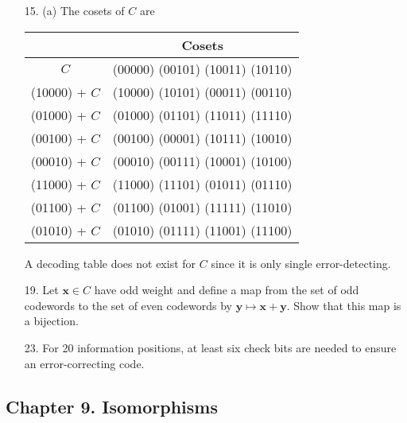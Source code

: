 {\begin{itemize}
 
\item[15.]
(a) The cosets of $C$ are 
\begin{center}
\begin{tabular}{|c|c|}
\hline
 & Cosets \\
\hline
          $C$ & (00000)  (00101)  (10011)  (10110) \\
(10000) + $C$ & (10000)  (10101)  (00011)  (00110) \\
(01000) + $C$ & (01000)  (01101)  (11011)  (11110) \\
(00100) + $C$ & (00100)  (00001)  (10111)  (10010) \\
(00010) + $C$ & (00010)  (00111)  (10001)  (10100) \\
(11000) + $C$ & (11000)  (11101)  (01011)  (01110) \\
(01100) + $C$ & (01100)  (01001)  (11111)  (11010) \\
(01010) + $C$ & (01010)  (01111)  (11001)  (11100) \\
\hline
\end{tabular}
\end{center}
A decoding table does not exist for $C$ since it is only single
error-detecting.  
 
\item[19.]
Let ${\mathbf x} \in C$ have odd weight and define a map from the set of
odd codewords to the set of even codewords by ${\mathbf y} \mapsto
{\mathbf x} + {\mathbf y}$. Show that this map is a bijection.
 
 
\item[23.]
For 20 information positions, at least six check bits are needed to
ensure an error-correcting code.
 
\end{itemize}
}
 
\subsection*{Chapter 9. Isomorphisms}
 

